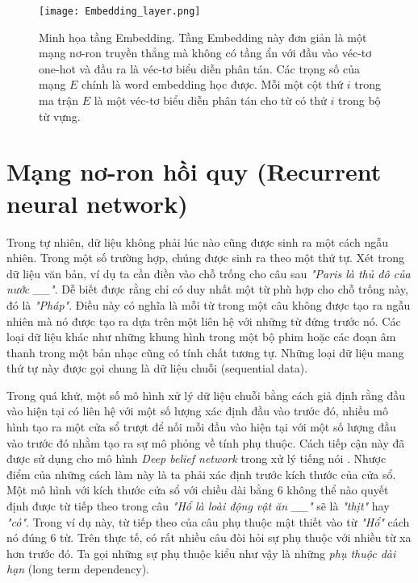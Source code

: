 \begin{figure}
	\centering
	\texttt{[image: Embedding\_layer.png]}
	\caption[Minh họa tầng Embedding.]{Minh họa tầng Embedding. Tầng Embedding này đơn giản là một mạng nơ-ron truyền thẳng mà không có tầng ẩn với đầu vào véc-tơ one-hot và đầu ra là véc-tơ biểu diễn phân tán. Các trọng số của mạng $E$ chính là word embedding học được. Mỗi một cột thứ $i$ trong ma trận $E$ là một véc-tơ biểu diễn phân tán cho từ có thứ $i$ trong bộ từ vựng.}
	\label{fig_embedding_layer}
\end{figure}

\section{Mạng nơ-ron hồi quy (Recurrent neural network)}
\label{rnnsection}

Trong tự nhiên, dữ liệu không phải lúc nào cũng được sinh ra một cách ngẫu nhiên. Trong một số trường hợp, chúng được sinh ra theo một thứ tự. Xét trong dữ liệu văn bản, ví dụ ta cần điền vào chỗ trống cho câu sau \textit{"Paris là thủ đô của nước \_\_"}. Dễ biết được rằng chỉ có duy nhất một từ phù hợp cho chỗ trống này, đó là \textit{"Pháp"}. Điều này có nghĩa là mỗi từ trong một câu không được tạo ra ngẫu nhiên mà nó được tạo ra dựa trên một liên hệ với những từ đứng trước nó. Các loại dữ liệu khác như những khung hình trong một bộ phim hoặc các đoạn âm thanh trong một bản nhạc cũng có tính chất tương tự. Những loại dữ liệu mang thứ tự này được gọi chung là dữ liệu chuỗi (sequential data).

Trong quá khứ, một số mô hình xử lý dữ liệu chuỗi bằng cách giả định rằng đầu vào hiện tại có liên hệ với một số lượng xác định đầu vào trước đó, nhiều mô hình tạo ra một cửa sổ trượt để nối mỗi đầu vào hiện tại với một số lượng đầu vào trước đó nhằm tạo ra sự mô phỏng về tính phụ thuộc. Cách tiếp cận này đã được sử dụng cho mô hình \textit{Deep belief network} trong xử lý tiếng nói \cite{massetal2012}. Nhược điểm của những cách làm này là ta phải xác định trước kích thước của cửa sổ. Một mô hình với kích thước cửa sổ với chiều dài bằng 6 không thể nào quyết định được từ tiếp theo trong câu \textit{"Hổ là loài động vật ăn \_\_"} sẽ là \textit{"thịt"} hay \textit{"cỏ"}. Trong ví dụ này, từ tiếp theo của câu phụ thuộc mật thiết vào từ \textit{"Hổ"} cách nó đúng 6 từ. Trên thực tế, có rất nhiều câu đòi hỏi sự phụ thuộc với nhiều từ xa hơn trước đó. Ta gọi những sự phụ thuộc kiểu như vậy là những \textit{phụ thuộc dài hạn} (long term dependency). 


